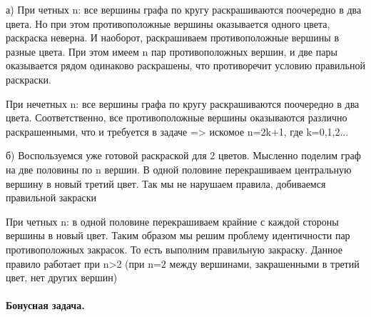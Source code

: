 \documentclass[a4paper,12pt]{article}
\begin{document}
а) При четных n: все вершины графа по кругу раскрашиваются поочередно в два цвета. Но при этом противоположные вершины оказывается одного цвета, раскраска неверна. И наоборот, раскрашиваем противоположные вершины в разные цвета. При этом имеем n пар противоположных вершин, и две пары оказывается рядом одинаково раскрашены, что противоречит условию правильной раскраски.

При нечетных n: все вершины графа по кругу раскрашиваются поочередно в два цвета. Соответственно, все противоположные вершины оказываются различно раскрашенными, что и требуется в задаче => искомое n=2k+1, где k=0,1,2...

б) Воспользуемся уже готовой раскраской для 2 цветов. Мысленно поделим граф на две половины по n вершин. В одной половине перекрашиваем центральную вершину в новый третий цвет. Так мы не нарушаем правила, добиваемся правильной закраски

При четных n: в одной половине перекрашиваем крайние с каждой стороны вершины в новый цвет. Таким образом мы решим проблему идентичности пар противоположных закрасок. То есть выполним правильную закраску. Данное правило работает при n>2 (при n=2 между вершинами, закрашенными в третий цвет, нет других вершин)
\\
\\
\textbf{Бонусная задача.} 
\end{document}
